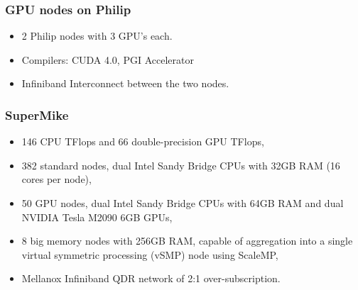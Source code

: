 \documentclass[slidestop,mathserif,compress,xcolor=svgnames,table]{beamer}
\newcommand*\vardiamond{\textcolor{tigerspurple}{%
  \ensuremath{\blacklozenge}}}
\newenvironment{eblock}[0]
{
\begin{beamerboxesrounded}[upper=uppercol2,lower=lowercol2,shadow=true]}
{\end{beamerboxesrounded}}
\begin{document}
\begin{frame}
\frametitle{\small GPU nodes on Philip}
\begin{eblock}{}
\begin{itemize}
\item 2  Philip nodes with 3  GPU's each.
\item Compilers: CUDA 4.0, PGI Accelerator
\item Infiniband Interconnect between the two nodes.
\end{itemize}
\end{eblock}
\end{frame}

\begin{frame}
  \frametitle{\small SuperMike}
  \begin{eblock}{}
    \begin{itemize}
      \item 146 CPU TFlops and 66 double-precision GPU TFlops,
      \item 382 standard nodes, dual Intel Sandy Bridge CPUs with 32GB RAM (16 cores per node),
      \item 50 GPU nodes, dual Intel Sandy Bridge CPUs with 64GB RAM and dual NVIDIA Tesla M2090 6GB GPUs,
      \item 8 big memory nodes with 256GB RAM, capable of aggregation into a single virtual symmetric processing (vSMP) node using ScaleMP,
      \item Mellanox Infiniband QDR network of 2:1 over-subscription.
    \end{itemize}
  \end{eblock}
\end{frame}
\end{document}
